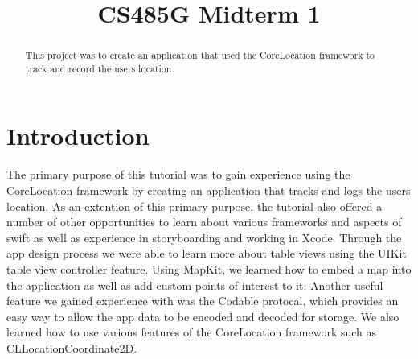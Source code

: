 \documentclass[conference]{IEEEtran}
\begin{document}
\title{CS485G Midterm 1}

\author{
\and
{}
\and
{}
}

\maketitle

\begin{abstract}
This project was to create an application that used the CoreLocation framework to track
and record the users location.
\end{abstract}

\section{Introduction}
The primary purpose of this tutorial was to gain experience using the CoreLocation
framework by creating an application that tracks and logs the users location. As an
extention of this primary purpose, the tutorial also offered a number of other opportunities
to learn about various frameworks and aspects of swift as well as experience in storyboarding
and working in Xcode. Through the app design process we were able to learn more about
table views using the UIKit table view controller feature. Using MapKit, we 
learned how to embed a map into the application as well as add custom points of 
interest to it. Another useful feature we gained experience with was the Codable
protocal, which provides an easy way to allow the app data to be encoded and decoded
for storage. We also learned how to use various features of the CoreLocation 
framework such as CLLocationCoordinate2D.
\end{document}
